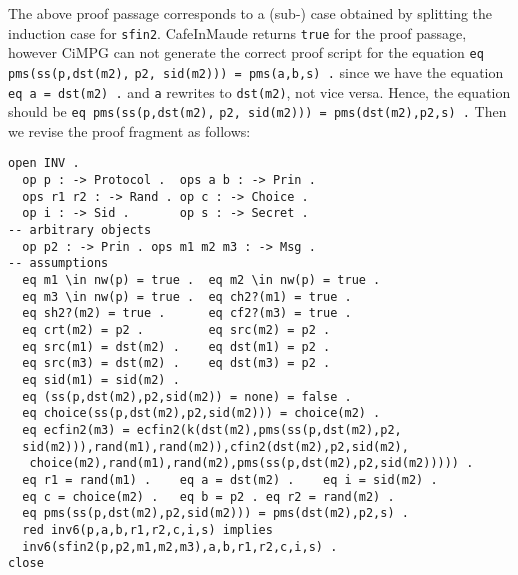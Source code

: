 \documentclass[a4paper,fleqn]{cas-dc}
\begin{document}
The above proof passage corresponds to a (sub-) case obtained by splitting the induction case for \verb!sfin2!. CafeInMaude returns \verb!true! for the proof passage, however CiMPG can not generate the correct proof script for the equation 
\verb!eq pms(ss(p,dst(m2),! \verb!p2, sid(m2))) = pms(a,b,s) .!
since we have the equation \verb!eq a = dst(m2) .! and \verb!a! rewrites to \verb!dst(m2)!, not vice versa. Hence, the equation should be \verb!eq pms(ss(p,dst(m2),! \verb!p2, sid(m2))) = pms(dst(m2),p2,s) .! Then we revise the proof fragment as follows:
\begin{small}
\begin{verbatim}
open INV .
  op p : -> Protocol .  ops a b : -> Prin .
  ops r1 r2 : -> Rand . op c : -> Choice .
  op i : -> Sid .       op s : -> Secret .
-- arbitrary objects
  op p2 : -> Prin . ops m1 m2 m3 : -> Msg .
-- assumptions
  eq m1 \in nw(p) = true .  eq m2 \in nw(p) = true .
  eq m3 \in nw(p) = true .  eq ch2?(m1) = true .
  eq sh2?(m2) = true .      eq cf2?(m3) = true .
  eq crt(m2) = p2 .         eq src(m2) = p2 .
  eq src(m1) = dst(m2) .    eq dst(m1) = p2 .
  eq src(m3) = dst(m2) .    eq dst(m3) = p2 .
  eq sid(m1) = sid(m2) .
  eq (ss(p,dst(m2),p2,sid(m2)) = none) = false .
  eq choice(ss(p,dst(m2),p2,sid(m2))) = choice(m2) .
  eq ecfin2(m3) = ecfin2(k(dst(m2),pms(ss(p,dst(m2),p2,
  sid(m2))),rand(m1),rand(m2)),cfin2(dst(m2),p2,sid(m2),
   choice(m2),rand(m1),rand(m2),pms(ss(p,dst(m2),p2,sid(m2))))) .
  eq r1 = rand(m1) .    eq a = dst(m2) .    eq i = sid(m2) .
  eq c = choice(m2) .   eq b = p2 . eq r2 = rand(m2) .
  eq pms(ss(p,dst(m2),p2,sid(m2))) = pms(dst(m2),p2,s) .
  red inv6(p,a,b,r1,r2,c,i,s) implies
  inv6(sfin2(p,p2,m1,m2,m3),a,b,r1,r2,c,i,s) .
close
\end{verbatim}
\end{small}
\end{document}
